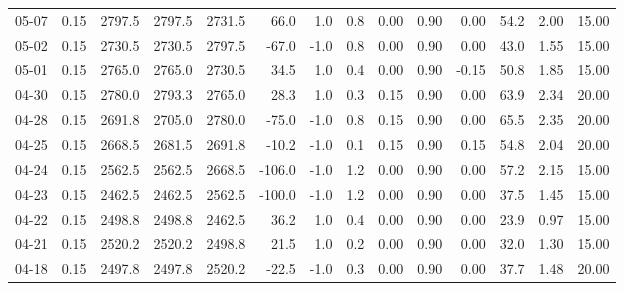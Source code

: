 \begin{threeparttable}
{\begin{tabular}{lrrrrrrrrrrrrr}
  05-07 &     0.15 & 2797.5 & 2797.5 & 2731.5 &       66.0 &                      1.0 &                 0.8 &       0.00 &      0.90 &           0.00 &             54.2 &            2.00 &                  15.00 \\
  05-02 &     0.15 & 2730.5 & 2730.5 & 2797.5 &      -67.0 &                     -1.0 &                 0.8 &       0.00 &      0.90 &           0.00 &             43.0 &            1.55 &                  15.00 \\
  05-01 &     0.15 & 2765.0 & 2765.0 & 2730.5 &       34.5 &                      1.0 &                 0.4 &       0.00 &      0.90 &          -0.15 &             50.8 &            1.85 &                  15.00 \\
  04-30 &     0.15 & 2780.0 & 2793.3 & 2765.0 &       28.3 &                      1.0 &                 0.3 &       0.15 &      0.90 &           0.00 &             63.9 &            2.34 &                  20.00 \\
  04-28 &     0.15 & 2691.8 & 2705.0 & 2780.0 &      -75.0 &                     -1.0 &                 0.8 &       0.15 &      0.90 &           0.00 &             65.5 &            2.35 &                  20.00 \\
  04-25 &     0.15 & 2668.5 & 2681.5 & 2691.8 &      -10.2 &                     -1.0 &                 0.1 &       0.15 &      0.90 &           0.15 &             54.8 &            2.04 &                  20.00 \\
  04-24 &     0.15 & 2562.5 & 2562.5 & 2668.5 &     -106.0 &                     -1.0 &                 1.2 &       0.00 &      0.90 &           0.00 &             57.2 &            2.15 &                  15.00 \\
  04-23 &     0.15 & 2462.5 & 2462.5 & 2562.5 &     -100.0 &                     -1.0 &                 1.2 &       0.00 &      0.90 &           0.00 &             37.5 &            1.45 &                  15.00 \\
  04-22 &     0.15 & 2498.8 & 2498.8 & 2462.5 &       36.2 &                      1.0 &                 0.4 &       0.00 &      0.90 &           0.00 &             23.9 &            0.97 &                  15.00 \\
  04-21 &     0.15 & 2520.2 & 2520.2 & 2498.8 &       21.5 &                      1.0 &                 0.2 &       0.00 &      0.90 &           0.00 &             32.0 &            1.30 &                  15.00 \\
  04-18 &     0.15 & 2497.8 & 2497.8 & 2520.2 &      -22.5 &                     -1.0 &                 0.3 &       0.00 &      0.90 &           0.00 &             37.7 &            1.48 &                  20.00 \\

\end{tabular}}
\end{threeparttable}
